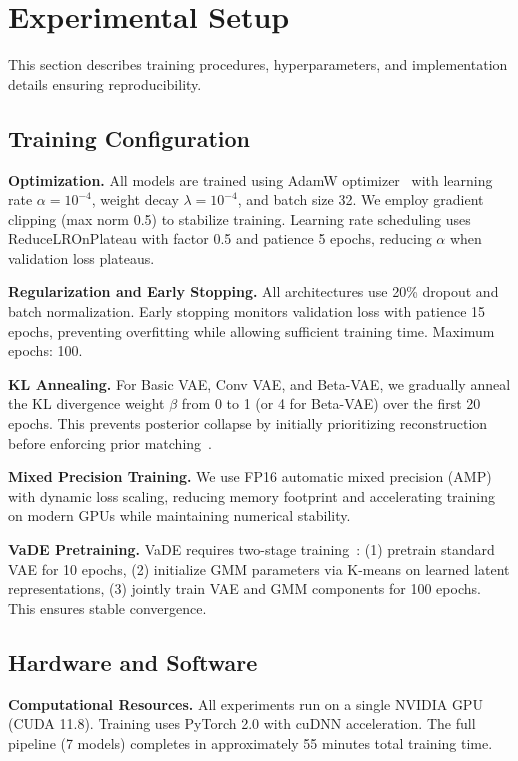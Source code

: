 \documentclass[10pt,twocolumn]{article}
\begin{document}
\section{Experimental Setup}
\label{sec:experiments}

This section describes training procedures, hyperparameters, and implementation details ensuring reproducibility.

\subsection{Training Configuration}

\textbf{Optimization.} All models are trained using AdamW optimizer~\cite{loshchilov2017adamw} with learning rate $\alpha = 10^{-4}$, weight decay $\lambda = 10^{-4}$, and batch size 32. We employ gradient clipping (max norm 0.5) to stabilize training. Learning rate scheduling uses ReduceLROnPlateau with factor 0.5 and patience 5 epochs, reducing $\alpha$ when validation loss plateaus.

\textbf{Regularization and Early Stopping.} All architectures use 20\% dropout and batch normalization. Early stopping monitors validation loss with patience 15 epochs, preventing overfitting while allowing sufficient training time. Maximum epochs: 100.

\textbf{KL Annealing.} For Basic VAE, Conv VAE, and Beta-VAE, we gradually anneal the KL divergence weight $\beta$ from 0 to 1 (or 4 for Beta-VAE) over the first 20 epochs. This prevents posterior collapse by initially prioritizing reconstruction before enforcing prior matching~\cite{bowman2016kl}.

\textbf{Mixed Precision Training.} We use FP16 automatic mixed precision (AMP) with dynamic loss scaling, reducing memory footprint and accelerating training on modern GPUs while maintaining numerical stability.

\textbf{VaDE Pretraining.} VaDE requires two-stage training~\cite{jiang2017variational}: (1) pretrain standard VAE for 10 epochs, (2) initialize GMM parameters via K-means on learned latent representations, (3) jointly train VAE and GMM components for 100 epochs. This ensures stable convergence.

\subsection{Hardware and Software}

\textbf{Computational Resources.} All experiments run on a single NVIDIA GPU (CUDA 11.8). Training uses PyTorch 2.0 with cuDNN acceleration. The full pipeline (7 models) completes in approximately 55 minutes total training time.
\end{document}
